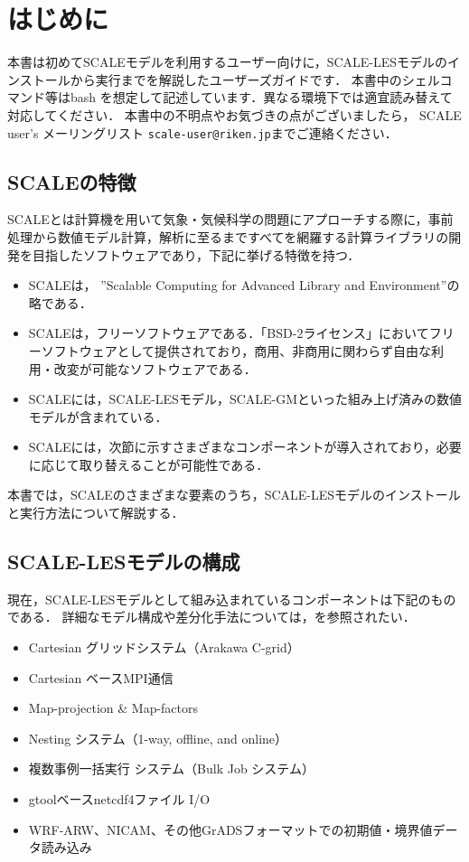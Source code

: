 \section{はじめに}

本書は初めてSCALEモデルを利用するユーザー向けに，SCALE-LESモデルのインストールから実行までを解説したユーザーズガイドです．
本書中のシェルコマンド等はbash を想定して記述しています．異なる環境下では適宜読み替えて対応してください．
本書中の不明点やお気づきの点がございましたら，
SCALE user's メーリングリスト \verb|scale-user@riken.jp|までご連絡ください．

\subsection{SCALEの特徴}
SCALEとは計算機を用いて気象・気候科学の問題にアプローチする際に，事前処理から数値モデル計算，解析に至るまですべてを網羅する計算ライブラリの開発を目指したソフトウェアであり，下記に挙げる特徴を持つ．
\begin{itemize}
\item SCALEは， ''Scalable Computing for Advanced Library and Environment''の略である．
\item SCALEは，フリーソフトウェアである．「BSD-2ライセンス」においてフリーソフトウェアとして提供されており，商用、非商用に関わらず自由な利用・改変が可能なソフトウェアである．
\item SCALEには，SCALE-LESモデル，SCALE-GMといった組み上げ済みの数値モデルが含まれている．
\item SCALEには，次節に示すさまざまなコンポーネントが導入されており，必要に応じて取り替えることが可能性である．
\end{itemize}

本書では，SCALEのさまざまな要素のうち，SCALE-LESモデルのインストールと実行方法について解説する．

\subsection{SCALE-LESモデルの構成}
現在，SCALE-LESモデルとして組み込まれているコンポーネントは下記のものである．
詳細なモデル構成や差分化手法については，\cite{scale_2015}を参照されたい．\\


\begin{itemize}
 \item Cartesian グリッドシステム（Arakawa C-grid）
 \item Cartesian ベースMPI通信
 \item Map-projection \& Map-factors
 \item Nesting システム（1-way, offline, and online）
 \item 複数事例一括実行 システム（Bulk Job システム）
 \item gtoolベースnetcdf4ファイル I/O
 \item WRF-ARW、NICAM、その他GrADSフォーマットでの初期値・境界値データ読み込み
\end{itemize}

